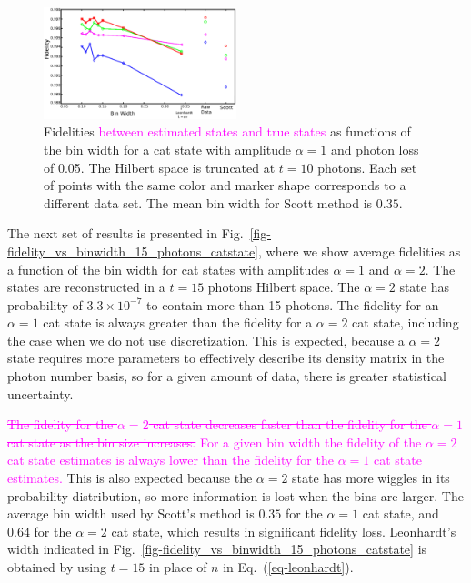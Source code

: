 \documentclass[
reprint,
superscriptaddress,
showpacs,
amsmath,
amssymb,
aps,
pra,
longbibliography
]{revtex4-1}
\providecommand{\aucmnt}[1]{#1}
\providecommand{\editcolor}[2]{\textcolor{#1}{#2}}
\providecommand{\aucmnt}[1]{}
\providecommand{\editcolor}[2]{#2}
\newcommand{\SG}[1]{\editcolor{magenta}{#1}}
\newcommand{\SGs}[1]{\aucmnt{\editcolor{magenta}{\sout{#1}}}}
\begin{document}
\begin{figure}
  \includegraphics[width=0.5\textwidth]{methods_fidelity_singledata.eps}
  \caption{Fidelities \SG{between estimated states and true states} as
    functions of the bin width for a cat state with amplitude
    $\alpha=1$ and photon loss of 0.05. The Hilbert space is truncated
    at $t=10$ photons. Each set of points with the same color and
    marker shape corresponds to a different data set. The mean bin
    width for Scott method is $0.35$.}
  \label{fig-methods_fidelity_singledata}
\end{figure}



The next set of results is presented in
Fig.~\ref{fig-fidelity_vs_binwidth_15_photons_catstate}, where we show
average fidelities as a function of the bin width for cat states with
amplitudes $\alpha=1$ and $\alpha=2$. The states are reconstructed in
a $t=15$ photons Hilbert space. The $\alpha=2$ state has probability
of $3.3 \times 10^{-7}$ to contain more than 15 photons.  The fidelity
for an $\alpha=1$ cat state is always greater than the fidelity for a
$\alpha=2$ cat state, including the case when we do not use
discretization. This is expected, because a $\alpha = 2$ state
requires more parameters to effectively describe its density matrix in
the photon number basis, so for a given amount of data, there is
greater statistical uncertainty.

\SGs{The fidelity for the $\alpha = 2$ cat state decreases faster than
  the fidelity for the $\alpha=1$ cat state as the bin size
  increases.}  \SG{For a given bin width the fidelity of the
  $\alpha=2$ cat state estimates is always lower than the fidelity for
  the $\alpha=1$ cat state estimates.} This is also expected because
the $\alpha = 2$ state has more wiggles in its probability
distribution, so more information is lost when the bins are
larger. The average bin width used by Scott's method is $0.35$ for the
$\alpha=1$ cat state, and $0.64$ for the $\alpha=2$ cat state, which
results in significant fidelity loss. Leonhardt's width indicated in
Fig.~\ref{fig-fidelity_vs_binwidth_15_photons_catstate} is obtained by
using $t=15$ in place of $n$ in Eq.~(\ref{eq-leonhardt}).
\end{document}

